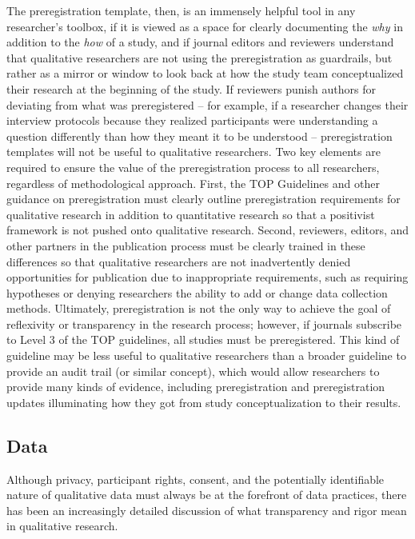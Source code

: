 \documentclass[authordate, meta, issue]{jote-new-article}
\begin{document}
The preregistration template, then, is an immensely helpful tool in any researcher’s toolbox, if it is viewed as a space for clearly documenting the \emph{why }in addition to the \emph{how} of a study, and if journal editors and reviewers understand that qualitative researchers are not using the preregistration as guardrails, but rather as a mirror or window to look back at how the study team conceptualized their research at the beginning of the study. If reviewers punish authors for deviating from what was preregistered – for example, if a researcher changes their interview protocols because they realized participants were understanding a question differently than how they meant it to be understood – preregistration templates will not be useful to qualitative researchers. Two key elements are required to ensure the value of the preregistration process to all researchers, regardless of methodological approach. First, the TOP Guidelines and other guidance on preregistration must clearly outline preregistration requirements for qualitative research in addition to quantitative research so that a positivist framework is not pushed onto qualitative research. Second, reviewers, editors, and other partners in the publication process must be clearly trained in these differences so that qualitative researchers are not inadvertently denied opportunities for publication due to inappropriate requirements, such as requiring hypotheses or denying researchers the ability to add or change data collection methods. Ultimately, preregistration is not the only way to achieve the goal of reflexivity or transparency in the research process; however, if journals subscribe to Level 3 of the TOP guidelines, all studies must be preregistered. This kind of guideline may be less useful to qualitative researchers than a broader guideline to provide an audit trail (or similar concept), which would allow researchers to provide many kinds of evidence, including preregistration and preregistration updates \parencites{Corker2022} illuminating how they got from study conceptualization to their results.







\subsection{Data}



Although privacy, participant rights, consent, and the potentially identifiable nature of qualitative data must always be at the forefront of data practices, there has been an increasingly detailed discussion of what transparency and rigor mean in qualitative research.
\end{document}
